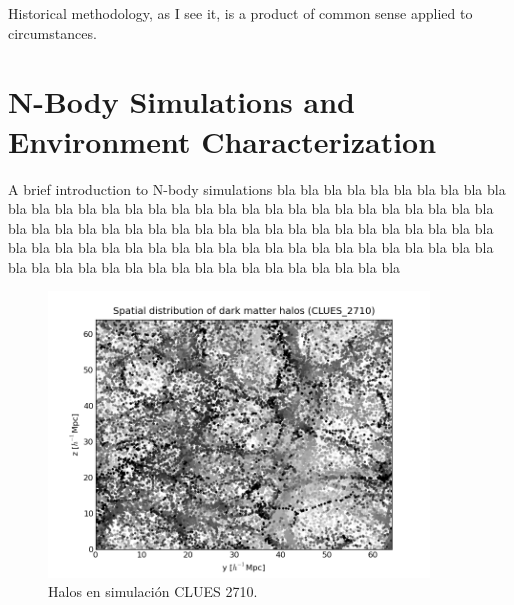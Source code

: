 

\begin{savequote}[50mm]
Historical methodology, as I see it, is a product of common sense applied to circumstances. 
\end{savequote}

\chapter{N-Body Simulations and Environment Characterization}
\label{cha:N-BodySimulationsAndEnvironmentCharacterization}

\ifpdf
    \graphicspath{{3_overall_methodology/figures/PNG/}{3_overall_methodology/figures/PDF/}{3_overall_methodology/figures/}}
\else
    \graphicspath{{3_overall_methodology/figures/EPS/}{3_overall_methodology/figures/}}
\fi


A brief introduction to N-body simulations 
bla bla bla bla bla bla bla bla bla bla bla bla bla bla bla bla bla bla 
bla bla bla bla bla bla bla bla bla bla bla bla bla bla bla bla bla bla 
bla bla bla bla bla bla bla bla bla bla bla bla bla bla bla bla bla bla 
bla bla bla bla bla bla bla bla bla bla bla bla bla bla bla bla bla bla 
bla bla bla bla bla bla bla bla bla bla bla bla bla bla bla bla bla bla 


\begin{figure}[htbp]
	\centering
	\includegraphics[width=0.9\textwidth]
	{./figures/3_nbody_simulations/Halos_Spatial_Distribution(CLUES_2710).png}
	
	\caption{\small{Halos en simulación CLUES 2710.}}
	
	\label{fig:CurvedSpaces}
\end{figure}


